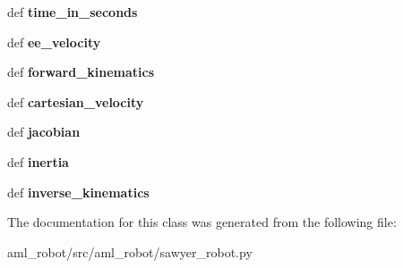 \begin{DoxyCompactItemize}
\item 
\hypertarget{classaml__robot_1_1sawyer__robot_1_1_sawyer_arm_ab8dbe0badd9c75683edeb93f53756e07}{def {\bfseries time\-\_\-in\-\_\-seconds}}\label{classaml__robot_1_1sawyer__robot_1_1_sawyer_arm_ab8dbe0badd9c75683edeb93f53756e07}

\item 
\hypertarget{classaml__robot_1_1sawyer__robot_1_1_sawyer_arm_a316282cb9b5942dfa55cb4b010fdd6a6}{def {\bfseries ee\-\_\-velocity}}\label{classaml__robot_1_1sawyer__robot_1_1_sawyer_arm_a316282cb9b5942dfa55cb4b010fdd6a6}

\item 
\hypertarget{classaml__robot_1_1sawyer__robot_1_1_sawyer_arm_a1687a7dfca12de4add767d32e5c38f6c}{def {\bfseries forward\-\_\-kinematics}}\label{classaml__robot_1_1sawyer__robot_1_1_sawyer_arm_a1687a7dfca12de4add767d32e5c38f6c}

\item 
\hypertarget{classaml__robot_1_1sawyer__robot_1_1_sawyer_arm_a371a242307532f01b393c363970f4219}{def {\bfseries cartesian\-\_\-velocity}}\label{classaml__robot_1_1sawyer__robot_1_1_sawyer_arm_a371a242307532f01b393c363970f4219}

\item 
\hypertarget{classaml__robot_1_1sawyer__robot_1_1_sawyer_arm_a7fae649376ab4a011f0ea4af9a12b760}{def {\bfseries jacobian}}\label{classaml__robot_1_1sawyer__robot_1_1_sawyer_arm_a7fae649376ab4a011f0ea4af9a12b760}

\item 
\hypertarget{classaml__robot_1_1sawyer__robot_1_1_sawyer_arm_ad24fa6e98c0918094a95d8032740e251}{def {\bfseries inertia}}\label{classaml__robot_1_1sawyer__robot_1_1_sawyer_arm_ad24fa6e98c0918094a95d8032740e251}

\item 
\hypertarget{classaml__robot_1_1sawyer__robot_1_1_sawyer_arm_a33180bf5f9be77229cd02e3aec82a4ae}{def {\bfseries inverse\-\_\-kinematics}}\label{classaml__robot_1_1sawyer__robot_1_1_sawyer_arm_a33180bf5f9be77229cd02e3aec82a4ae}

\end{DoxyCompactItemize}


The documentation for this class was generated from the following file\-:\begin{DoxyCompactItemize}
\item 
aml\-\_\-robot/src/aml\-\_\-robot/sawyer\-\_\-robot.\-py\end{DoxyCompactItemize}
